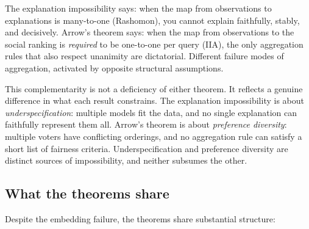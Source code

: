 The explanation impossibility says: when the map from observations to
explanations is many-to-one (Rashomon), you cannot explain faithfully,
stably, and decisively. Arrow's theorem says: when the map from
observations to the social ranking is \emph{required} to be
one-to-one per query (IIA), the only aggregation rules that also
respect unanimity are dictatorial. Different failure modes of
aggregation, activated by opposite structural assumptions.

This complementarity is not a deficiency of either theorem. It
reflects a genuine difference in what each result constrains.
The explanation impossibility is about \emph{underspecification}:
multiple models fit the data, and no single explanation can
faithfully represent them all. Arrow's theorem is about
\emph{preference diversity}: multiple voters have conflicting
orderings, and no aggregation rule can satisfy a short list of
fairness criteria. Underspecification and preference diversity are
distinct sources of impossibility, and neither subsumes the other.

\subsection{What the theorems share}
\label{sec:arrow-shared-structure}

Despite the embedding failure, the theorems share substantial
structure:

